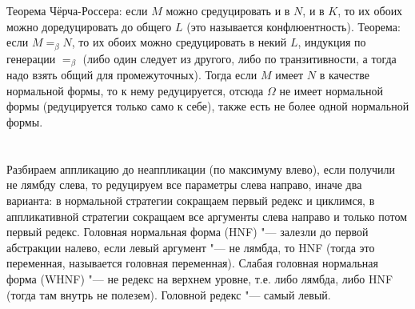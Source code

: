 \section{} %
Теорема Чёрча-Россера: если $M$ можно средуцировать и в $N$, и в $K$, то их обоих можно доредуцировать
до общего $L$ (это называется конфлюентность).
Теорема: если $M=_\beta N$, то их обоих можно средуцировать в некий $L$,
индукция по генерации $=_\beta$ (либо один следует из другого, либо по транзитивности,
а тогда надо взять общий для промежуточных).
Тогда если $M$ имеет $N$ в качестве нормальной формы, то к нему редуцируется, отсюда
$\Omega$ не имеет нормальной формы (редуцируется только само к себе),
также есть не более одной нормальной формы.

\section{} %
Разбираем аппликацию до неаппликации (по максимуму влево), если получили
не лямбду слева, то редуцируем все параметры слева направо,
иначе два варианта: в нормальной стратегии сокращаем первый редекс и циклимся,
в аппликативной стратегии сокращаем все аргументы слева направо и только потом первый редекс.
Головная нормальная форма (HNF) "--- залезли до первой абстракции налево, если левый аргумент "--- не лямбда, то HNF (тогда
это переменная, называется головная переменная).
Слабая головная нормальная форма (WHNF) "--- не редекс на верхнем уровне, т.е. либо лямбда, либо HNF (тогда там внутрь не полезем).
Головной редекс "--- самый левый.
\TODO

\section{} %
